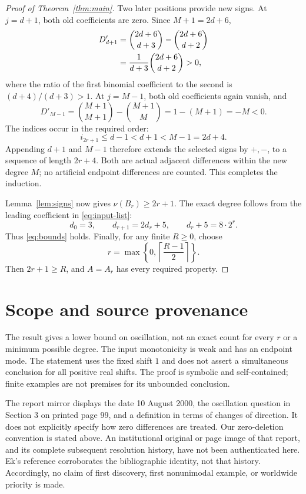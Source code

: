 \documentclass[11pt]{article}
\begin{document}
\begin{proof}[Proof of Theorem~\ref{thm:main}]
Two later positions provide new signs. At $j=d+1$, both old
coefficients are zero. Since $M+1=2d+6$,
\begin{align}
 D'_{d+1}
 &=\binom{2d+6}{d+3}-\binom{2d+6}{d+2}\notag\\
 &=\frac{1}{d+3}\binom{2d+6}{d+2}>0,\label{eq:new-positive}
\end{align}
where the ratio of the first binomial coefficient to the second is
$(d+4)/(d+3)>1$.
At $j=M-1$, both old coefficients again vanish, and
\begin{equation}\label{eq:new-negative}
 D'_{M-1}=\binom{M+1}{M+1}-\binom{M+1}{M}
 =1-(M+1)=-M<0.
\end{equation}
The indices occur in the required order:
\begin{equation}\label{eq:index-order}
 i_{2r+1}\leq d-1<d+1<M-1=2d+4.
\end{equation}
Appending $d+1$ and $M-1$ therefore extends the selected signs
by $+,-$, to a sequence of length $2r+4$. Both are actual
adjacent differences within the new degree $M$; no artificial
endpoint differences are counted. This completes the induction.

Lemma~\ref{lem:signs} now gives $\nu(B_r)\geq2r+1$.
The exact degree follows from the leading coefficient in
\eqref{eq:input-list}:
\[
 d_0=3,\qquad d_{r+1}=2d_r+5,
 \qquad d_r+5=8\cdot2^r.
\]
Thus \eqref{eq:bounds} holds. Finally, for any finite $R\geq0$,
choose
\begin{equation}\label{eq:R-choice}
 r=\max\left\{0,\left\lceil\frac{R-1}{2}\right\rceil\right\}.
\end{equation}
Then $2r+1\geq R$, and $A=A_r$ has every required property.
\end{proof}

\section{Scope and source provenance}

The result gives a lower bound on oscillation, not an exact count
for every $r$ or a minimum possible degree. The input monotonicity
is weak and has an endpoint mode. The statement uses the fixed
shift $1$ and does not assert a simultaneous conclusion for all
positive real shifts. The proof is symbolic and self-contained;
finite examples are not premises for its unbounded conclusion.

The report mirror \cite{AAR} displays the date 10 August 2000,
the oscillation question in Section 3 on printed page 99, and a
definition in terms of changes of direction. It does not explicitly
specify how zero differences are treated. Our zero-deletion convention
is stated above. An institutional original or page image of that
report, and its complete subsequent resolution history, have not
been authenticated here. Ek's reference \cite{Ek} corroborates the
bibliographic identity, not that history. Accordingly, no claim of
first discovery, first nonunimodal example, or worldwide priority
is made.
\end{document}
